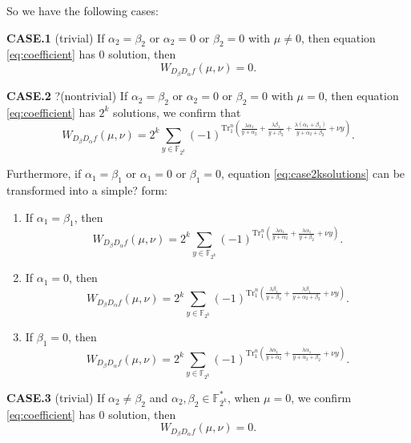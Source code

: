 \documentclass[runningheads,a4paper]{article}
\newcommand{\F}{\mathbb{F}}
\newcommand{\0}{\textbf{0}}
\newcommand{\1}{\textbf{1}}
\renewcommand{\Tr}{\mathrm{Tr}_1^n}
\begin{document}
    So we have the following cases:

    \textbf{CASE.1} (trivial) If $ \alpha_2=\beta_2 $ or $ \alpha_2=0 $ or $ \beta_2=0 $ with $ \mu\ne 0 $, 
    then equation \eqref{eq:coefficient} has $ 0 $ solution, then
    \[W_{D_{\beta}D_{\alpha}f}(\mu,\nu)=0.\]

    \textbf{CASE.2} ?(nontrivial) If $ \alpha_2=\beta_2 $ or $ \alpha_2=0 $ or $ \beta_2=0 $ with $ \mu=0 $, 
    then equation \eqref{eq:coefficient} has $ 2^k $ solutions, we confirm that 
    \begin{equation}\label{eq:case2ksolutions}
        W_{D_{\beta}D_{\alpha}f}(\mu,\nu)=2^k\sum_{y\in\F_{2^k}}(-1)^{\Tr\left(\frac{\lambda\alpha_1}{y+\alpha_2}+\frac{\lambda\beta_1}{y+\beta_2}+\frac{\lambda(\alpha_1+\beta_1)}{y+\alpha_2+\beta_2}+\nu y\right)}.
    \end{equation}
    
    Furthermore, if $ \alpha_1=\beta_1 $ or $ \alpha_1=0 $ or $ \beta_1=0 $, equation \eqref{eq:case2ksolutions} can be transformed into a simple? form:
    \begin{enumerate}[label=(\arabic{*})]
        \item   If $ \alpha_1=\beta_1 $, then 
        \begin{equation}
            W_{D_{\beta}D_{\alpha}f}(\mu,\nu)=2^k\sum_{y\in\F_{2^k}}(-1)^{\Tr\left(\frac{\lambda\alpha_1}{y+\alpha_2}+\frac{\lambda\alpha_1}{y+\beta_2}+\nu y\right)}.
        \end{equation}
        \item   If $ \alpha_1=0 $, then 
        \begin{equation}
            W_{D_{\beta}D_{\alpha}f}(\mu,\nu)=2^k\sum_{y\in\F_{2^k}}(-1)^{\Tr\left(\frac{\lambda\beta_1}{y+\beta_2}+\frac{\lambda\beta_1}{y+\alpha_2+\beta_2}+\nu y\right)}.
        \end{equation}
        \item   If $ \beta_1=0 $, then 
        \begin{equation}
            W_{D_{\beta}D_{\alpha}f}(\mu,\nu)=2^k\sum_{y\in\F_{2^k}}(-1)^{\Tr\left(\frac{\lambda\alpha_1}{y+\alpha_2}+\frac{\lambda\alpha_1}{y+\alpha_2+\beta_2}+\nu y\right)}.
        \end{equation}
    \end{enumerate}

    \textbf{CASE.3} (trivial) If $ \alpha_2\ne\beta_2 $ and $ \alpha_2,\beta_2\in\F_{2^k}^* $, when $ \mu=0 $, 
    we confirm \eqref{eq:coefficient} has $ 0 $ solution, then
    \[W_{D_{\beta}D_{\alpha}f}(\mu,\nu)=0.\]
\end{document}
